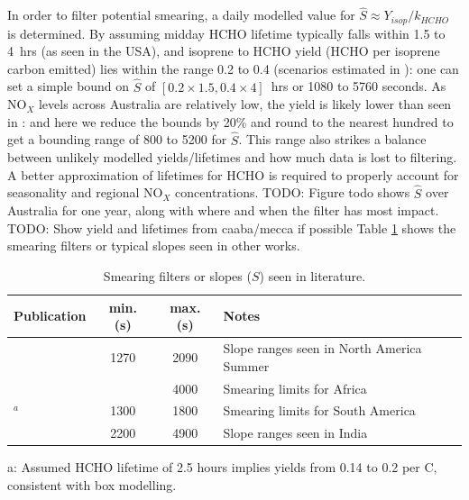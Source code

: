     In order to filter potential smearing, a daily modelled value for $\hat{S} \approx Y_{isop}/k_{HCHO}$ is determined.
    By assuming midday HCHO lifetime typically falls within 1.5 to 4~hrs (as seen in the USA), and isoprene to HCHO yield (HCHO per isoprene carbon emitted) lies within the range 0.2 to 0.4 (scenarios estimated in \textcite{Palmer2003}): one can set a simple bound on $\hat{S}$ of $[0.2 \times 1.5, 0.4 \times 4]$~hrs or 1080 to 5760 seconds.
    As NO$_X$ levels across Australia are relatively low, the yield is likely lower than seen in \textcite{Palmer2003}: and here we reduce the bounds by 20\% and round to the nearest hundred to get a bounding range of 800 to 5200 for $\hat{S}$. 
    This range also strikes a balance between unlikely modelled yields/lifetimes and how much data is lost to filtering.
    A better approximation of lifetimes for HCHO is required to properly account for seasonality and regional NO$_X$ concentrations.
    TODO: Figure todo shows $\hat{S}$ over Australia for one year, along with where and when the filter has most impact.
    TODO: Show yield and lifetimes from caaba/mecca if possible
    Table \ref{BioIsop:Method:Smearing:tab_smearing_ranges} shows the smearing filters or typical slopes seen in other works.
    
    \begin{table}\begin{threeparttable}
        \caption{Smearing filters or slopes ($S$) seen in literature.}
        \begin{tabular}{ l | c  c  >{\centering\arraybackslash}p{5cm} } 
          \toprule
          Publication & min. (s) & max. (s) & Notes \\
          \midrule
          \textcite{Palmer2003}      & 1270 & 2090 & Slope ranges seen in North America Summer \\
          \textcite{Marais2012}      &      & 4000 & Smearing limits for Africa \\
          \textcite{Barkley2013}$^a$ & 1300 & 1800 & Smearing limits for South America \\
          \textcite{Surl2018}        & 2200 & 4900 & Slope ranges seen in India \\
          
          \bottomrule
        \end{tabular}
        \begin{tablenotes} 
          \item a: Assumed HCHO lifetime of 2.5 hours implies yields from 0.14 to 0.2 per C, consistent with box modelling.
        \end{tablenotes}
        \label{BioIsop:Method:Smearing:tab_smearing_ranges}
      \end{threeparttable}\end{table}
    
